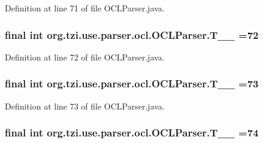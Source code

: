 Definition at line 71 of file O\-C\-L\-Parser.\-java.

\hypertarget{classorg_1_1tzi_1_1use_1_1parser_1_1ocl_1_1_o_c_l_parser_a70bdc860bbc3b7316d4d300d128ec6dd}{
\subsubsection[{T\-\_\-\-\_\-72}]{\setlength{\rightskip}{0pt plus 5cm}final int org.\-tzi.\-use.\-parser.\-ocl.\-O\-C\-L\-Parser.\-T\-\_\-\-\_ =72\hspace{0.3cm}{\ttfamily [static]}}}\label{classorg_1_1tzi_1_1use_1_1parser_1_1ocl_1_1_o_c_l_parser_a70bdc860bbc3b7316d4d300d128ec6dd}


Definition at line 72 of file O\-C\-L\-Parser.\-java.

\hypertarget{classorg_1_1tzi_1_1use_1_1parser_1_1ocl_1_1_o_c_l_parser_a0dbf1347e05a2599e93c4f6ba5d5b543}{
\subsubsection[{T\-\_\-\-\_\-73}]{\setlength{\rightskip}{0pt plus 5cm}final int org.\-tzi.\-use.\-parser.\-ocl.\-O\-C\-L\-Parser.\-T\-\_\-\-\_ =73\hspace{0.3cm}{\ttfamily [static]}}}\label{classorg_1_1tzi_1_1use_1_1parser_1_1ocl_1_1_o_c_l_parser_a0dbf1347e05a2599e93c4f6ba5d5b543}


Definition at line 73 of file O\-C\-L\-Parser.\-java.

\hypertarget{classorg_1_1tzi_1_1use_1_1parser_1_1ocl_1_1_o_c_l_parser_a24334d8e1847fe05520c3a7e0cca0774}{
\subsubsection[{T\-\_\-\-\_\-74}]{\setlength{\rightskip}{0pt plus 5cm}final int org.\-tzi.\-use.\-parser.\-ocl.\-O\-C\-L\-Parser.\-T\-\_\-\-\_ =74\hspace{0.3cm}{\ttfamily [static]}}}\label{classorg_1_1tzi_1_1use_1_1parser_1_1ocl_1_1_o_c_l_parser_a24334d8e1847fe05520c3a7e0cca0774}


